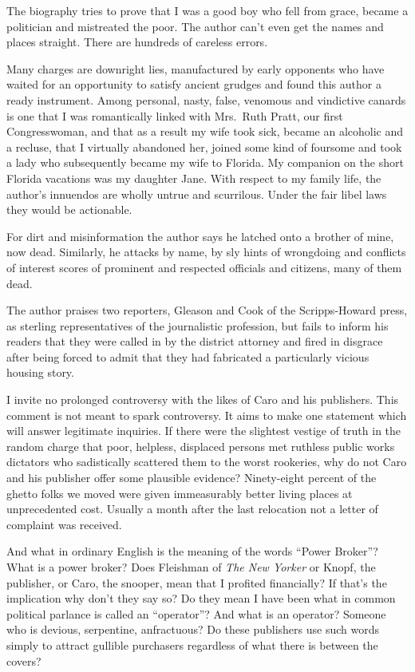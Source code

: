 \documentclass[11pt,letterpaper]{article}
\begin{document}
The biography tries to prove that I was a good boy who fell from grace, became a politician and mistreated the poor. The author can't even get the names and places straight. There are hundreds of careless errors.

Many charges are downright lies, manufactured by early opponents who have waited for an opportunity to satisfy ancient grudges and found this author a ready instrument. Among personal, nasty, false, venomous and vindictive canards is one that I was romantically linked with Mrs.\ Ruth Pratt, our first Congresswoman, and that as a result my wife took sick, became an alcoholic and a recluse, that I virtually abandoned her, joined some kind of foursome and took a lady who subsequently became my wife to Florida. My companion on the short Florida vacations was my daughter Jane. With respect to my family life, the author's innuendos are wholly untrue and scurrilous. Under the fair libel laws they would be actionable.

For dirt and misinformation the author says he latched onto a brother of mine, now dead. Similarly, he attacks by name, by sly hints of wrongdoing and conflicts of interest scores of prominent and respected officials and citizens, many of them dead.

The author praises two reporters, Gleason and Cook of the Scripps-Howard press, as sterling representatives of the journalistic profession, but fails to inform his readers that they were called in by the district attorney and fired in disgrace after being forced to admit that they had fabricated a particularly vicious housing story.

I invite no prolonged controversy with the likes of Caro and his publishers. This comment is not meant to spark controversy. It aims to make one statement which will answer legitimate inquiries. If there were the slightest vestige of truth in the random charge that poor, helpless, displaced persons met ruthless public works dictators who sadistically scattered them to the worst rookeries, why do not Caro and his publisher offer some plausible evidence? Ninety-eight percent of the ghetto folks we moved were given immeasurably better living places at unprecedented cost. Usually a month after the last relocation not a letter of complaint was received.

And what in ordinary English is the meaning of the words \enquote{Power Broker}? What is a power broker? Does Fleishman of \textit{The New Yorker} or Knopf, the publisher, or Caro, the snooper, mean that I profited financially? If that's the implication why don't they say so? Do they mean I have been what in common political parlance is called an \enquote{operator}? And what is an operator? Someone who is devious, serpentine, anfractuous? Do these publishers use such words simply to attract gullible purchasers regardless of what there is between the covers?
\end{document}
